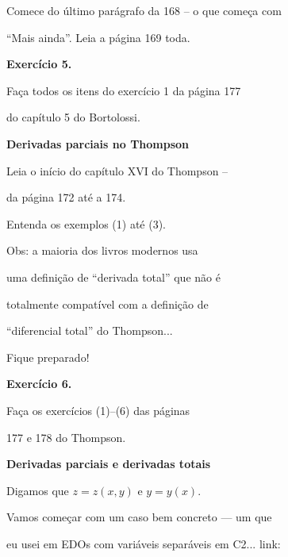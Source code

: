 \documentclass[oneside,12pt]{article}
\begin{document}
Comece do último parágrafo da 168 -- o que começa com

``Mais ainda''. Leia a página 169 toda.

\bsk


{\bf Exercício 5.}

Faça todos os itens do exercício 1 da página 177

do capítulo 5 do Bortolossi.


\newpage


{\bf Derivadas parciais no Thompson}

Leia o início do capítulo XVI do Thompson --

da página 172 até a 174.

Entenda os exemplos (1) até (3).

\msk

Obs: a maioria dos livros modernos usa

uma definição de ``derivada total'' que não é

totalmente compatível com a definição de

``diferencial total'' do Thompson...

Fique preparado!

\bsk

{\bf Exercício 6.}

Faça os exercícios (1)--(6) das páginas

177 e 178 do Thompson.





\newpage


{\bf Derivadas parciais e derivadas totais}

Digamos que $z = z(x,y)$ e $y = y(x)$.

\msk

Vamos começar com um caso bem concreto --- um que

eu usei em EDOs com variáveis separáveis em C2... link:
\ssk
\end{document}

